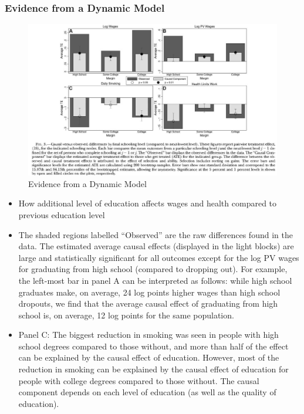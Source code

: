\subsubsection{Evidence from a Dynamic Model}  
\begin{figure}[H]%
                \centering
                \includegraphics[width=5in]{images/ch3/48.png}
                \caption {Evidence from a Dynamic Model}
            \end{figure}
\begin{itemize}
    \item How additional level of education affects wages and health compared to previous education level
    \item The shaded regions labelled “Observed” are the raw differences found in the data. The estimated average causal effects (displayed in the light blocks) are large and statistically significant for all outcomes except for the log PV wages for graduating from high school (compared to dropping out). For example, the left-most bar in panel A can be interpreted as follows: while high school graduates make, on average, 24 log points higher wages than high school dropouts, we find that the average causal effect of graduating from high school is, on average, 12 log points for the same population.
    \item Panel C: The biggest reduction in smoking was seen in people with high school degrees compared to those without, and more than half of the effect can be explained by the causal effect of education. However, most of the reduction in smoking can be explained by the causal effect of education for people with college degrees compared to those without. The causal component depends on each level of education (as well as the quality of education).
\end{itemize}

